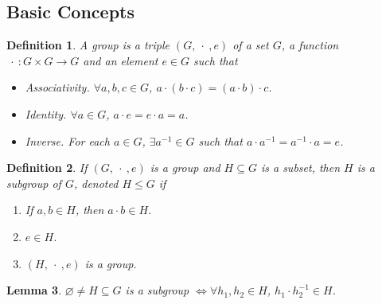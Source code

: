 \documentclass{article}
\theoremstyle{plain}\theoremheaderfont{\normalfont\itshape}\theorembodyfont{\rmfamily}\theoremseparator{.}\newtheorem*{rem}{Remark}\newtheorem*{ex}{Example}\newtheorem*{proof}{Proof}\newtheorem*{altp}{Alternative proof}\newtheorem*{nonex}{Non-Example}
\theoremstyle{plain}\theoremheaderfont{\normalfont\bfseries}\theorembodyfont{\rmfamily}\theoremseparator{.}\newtheorem{thm}{Theorem}[section]\newtheorem{lem}[thm]{Lemma}\newtheorem{prop}[thm]{Proposition}\newtheorem*{cor}{Corollary}\newtheorem{defn}[thm]{Definition}\newtheorem{clm}[thm]{Claim}\newtheorem{clminproof}{Claim}\newtheorem*{notn}{Notation}\newtheorem*{exer}{Exercise}\newtheorem*{lemnn}{Lemma}
\theoremstyle{break}\theoremheaderfont{\normalfont\itshape}\theorembodyfont{\rmfamily}\theoremseparator{.\medskip}\newtheorem*{proofskip}{Proof}\newtheorem*{exs}{Examples}\newtheorem*{rems}{Remarks}\newtheorem*{obs}{Observations}
\theoremstyle{break}\theoremheaderfont{\normalfont\bfseries}\theorembodyfont{\rmfamily}\theoremseparator{.\medskip}\newtheorem{lemskip}[thm]{Lemma}\newtheorem{defnskip}[thm]{Definition}\newtheorem{propskip}[thm]{Proposition}\newtheorem{thmskip}[thm]{Theorem}
\numberwithin{equation}{section}
\begin{document}
    \subsection{Basic Concepts}
    \begin{defn}
        A \textit{group} is a triple \((G,\ \cdot \ , e)\) of a set \(G\), a function \(\ \cdot\ :G\times G\to G\) and an element \(e\in G\) such that
        \begin{itemize}[topsep=0pt,leftmargin=40pt]
            \item[(G1)] Associativity. \(\forall a,b,c\in G\), \(a\cdot(b\cdot c)=(a\cdot b)\cdot c\).
            \item[(G2)] Identity. \(\forall a\in G\), \(a\cdot e=e\cdot a=a\).
            \item[(G3)] Inverse. For each \(a\in G\), \(\exists a^{-1}\in G\) such that \(a\cdot a^{-1}=a^{-1}\cdot a=e\).  
        \end{itemize}
    \end{defn}
    \begin{defn}
        If \((G,\ \cdot \ ,e)\) is a group and \(H\subseteq G\) is a subset, then \(H\) is a \textit{subgroup} of \(G\), denoted \(H\le G\) if
        \begin{enumerate}[topsep=0pt,label=(\roman*)]
            \item If \(a,b\in H\), then \(a\cdot b\in H\).
            \item \(e\in H\).
            \item \((H, \ \cdot \ ,e)\) is a group.
        \end{enumerate}
    \end{defn}
    \begin{lem}
        \(\varnothing\ne H\subseteq G\) is a subgroup \(\iff\forall h_1,h_2\in H\), \(h_1\cdot h_2^{-1}\in H\).
    \end{lem}
\end{document}
